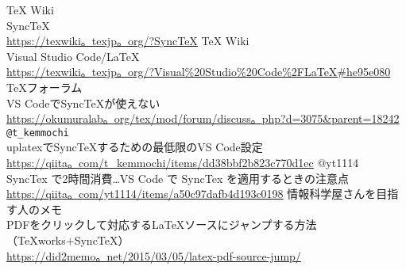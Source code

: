 \documentclass{ltjsarticle}
\begin{document}
\begin{thebibliography}{999}
  TeX Wiki\\
  SyncTeX\\
  \url{https://texwiki。texjp。org/?SyncTeX}
  TeX Wiki\\
  Visual Studio Code/LaTeX\\
  \url{https://texwiki。texjp。org/?Visual%20Studio%20Code%2FLaTeX#he95e080}
  TeXフォーラム\\
  VS CodeでSyncTeXが使えない\\
  \url{https://okumuralab。org/tex/mod/forum/discuss。php?d=3075&parent=18242}
  \verb|@t_kemmochi|\\
  uplatexでSyncTeXするための最低限のVS Code設定\\
  \url{https://qiita。com/t_kemmochi/items/dd38bbf2b823c770d1ec}
  @yt1114\\
  SyncTex で2時間消費…VS Code で SyncTex を適用するときの注意点\\
  \url{https://qiita。com/yt1114/items/a50c97dafb4d193c0198}
  情報科学屋さんを目指す人のメモ\\
  PDFをクリックして対応するLaTeXソースにジャンプする方法（TeXworks+SyncTeX）\\
  \url{https://did2memo。net/2015/03/05/latex-pdf-source-jump/}


\end{thebibliography}
\end{document}
